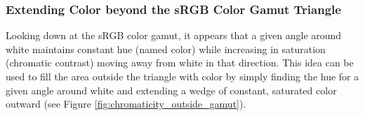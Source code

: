 \documentclass[twocolumn]{article}
\newif\ifinvert
\begin{document}
\subsubsection{Extending Color beyond the sRGB Color Gamut Triangle}
Looking down at the sRGB color gamut, it appears that a given angle around white maintains constant hue (named color) while increasing in saturation (chromatic contrast) moving away from white in that direction.  This idea can be used to fill the area outside the triangle with color by simply finding the hue for a given angle around white and extending a wedge of constant, saturated color outward (see Figure \ref{fig:chromaticity_outside_gamut}).
\begin{figure*}[h]
    \ifinvert
        
    \else
        
    \fi
    \caption{Filling in colors outside of the color gamut triangle (but within the CIE 1931 2$^\circ$ spectrum locus).  The method applied does not vary in color saturation (see left panel where the central point is not white), but the top-down view of high-saturation surfaces can be placed on top (see right panel).  Note that the colors within the triangle in the right panel are less saturated than the colored region outside the triangle creating a discontinuity (i.e. the triangle edges are apparent).  IMAGE LINK, CODE LINK}\label{fig:chromaticity_outside_gamut}
\end{figure*}
\end{document}
